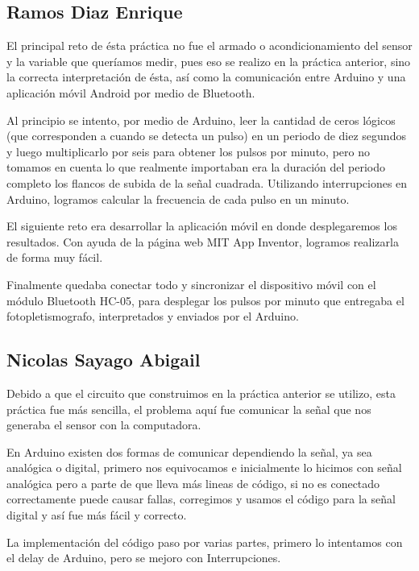 \documentclass[12pt]{article}
\begin{document}
    \subsection{Ramos Diaz Enrique}
        El principal reto de ésta práctica no fue el armado o acondicionamiento del sensor y la variable que queríamos medir, pues eso se realizo en la práctica anterior, sino la correcta interpretación de ésta, así como la comunicación entre Arduino y una aplicación móvil Android por medio de Bluetooth.
    
        Al principio se intento, por medio de Arduino, leer la cantidad de ceros lógicos (que corresponden a cuando se detecta un pulso) en un periodo de diez segundos y luego multiplicarlo por seis para obtener los pulsos por minuto, pero no tomamos en cuenta lo que realmente importaban era la duración del periodo completo los flancos de subida de la señal cuadrada. Utilizando interrupciones en Arduino, logramos calcular la frecuencia de cada pulso en un minuto.
    
        El siguiente reto era desarrollar la aplicación móvil en donde desplegaremos los resultados. Con ayuda de la página web MIT App Inventor, logramos realizarla de forma muy fácil.
    
        Finalmente quedaba conectar todo y sincronizar el dispositivo móvil con el módulo Bluetooth HC-05, para desplegar los pulsos por minuto que entregaba el fotopletismografo, interpretados y enviados por el Arduino.    
   
   \subsection{Nicolas Sayago Abigail}
        Debido a que el circuito que construimos en la práctica anterior se utilizo, esta práctica fue más sencilla, el problema aquí fue comunicar la señal que nos generaba el sensor con la computadora.
        
        En Arduino existen dos formas de comunicar dependiendo la señal, ya sea analógica o digital, primero nos equivocamos e inicialmente lo hicimos con señal analógica pero a parte de que lleva más lineas de código, si no es conectado correctamente puede causar fallas, corregimos y usamos el código para la señal digital y así fue más fácil y correcto.
        
        La implementación del código paso por varias partes, primero lo intentamos con el delay de Arduino, pero se mejoro con Interrupciones.
\end{document}
